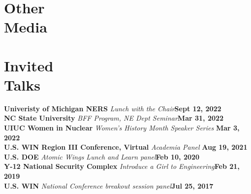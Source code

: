 \documentclass[margin,line]{resume}
\begin{document}
\begin{resume}
    \section{\mysidestyle Other\\Media}
    \begin{bibenum}
        \item {}
        \item {}
    \end{bibenum}
    \section{\mysidestyle Invited\\Talks}
    \textbf{Univeristy of Michigan NERS} \textsl{Lunch with the Chair}\hfill \textbf{Sept 12, 2022}\\
    \textbf{NC State University} \textsl{BFF Program, NE Dept Seminar}\hfill\textbf{Mar 31, 2022}\\
    \textbf{UIUC Women in Nuclear} \textsl{Women's History Month Speaker Series} \hfill\textbf{Mar 3, 2022}\\
    \textbf{U.S. WIN Region III Conference, Virtual} \textsl{Academia Panel} \hfill \textbf{Aug 19, 2021}\\
    \textbf{U.S. DOE} \textsl{Atomic Wings Lunch and Learn panel}\hfill \textbf{Feb 10, 2020} \\
    \textbf{Y-12 National Security Complex} \textsl{Introduce a Girl to Engineering}\hfill \textbf{Feb 21, 2019} \\
    \textbf{U.S. WIN} \textsl{National Conference breakout session panel}\hfill \textbf{Jul 25, 2017} \\

\end{resume}
\end{document}
